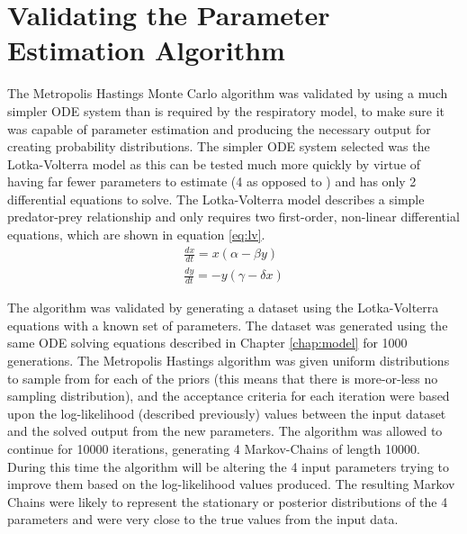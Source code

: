 \section{Validating the Parameter Estimation Algorithm}

The Metropolis Hastings Monte Carlo algorithm was validated by using a much simpler ODE system than is required by the respiratory model, to make sure it was capable of parameter estimation and producing the necessary output for creating probability distributions. The simpler ODE system selected was the Lotka-Volterra model as this can be tested much more quickly by virtue of having far fewer parameters to estimate (4 as opposed to ) and has only 2 differential equations to solve. The Lotka-Volterra model describes a simple predator-prey relationship\cite{Lotka1925,Volterra1931} and only requires two first-order, non-linear differential equations, which are shown in equation \ref{eq:lv}.
\begin{eqnarray}
\frac{dx}{dt} = x (\alpha - \beta y)\nonumber \\
\frac{dy}{dt} = -y (\gamma - \delta x)
\label{eq:lv}
\end{eqnarray}

The algorithm was validated by generating a dataset using the Lotka-Volterra equations with a known set of parameters. The dataset was generated using the same ODE solving equations described in Chapter \ref{chap:model} for 1000 generations. The Metropolis Hastings algorithm was given uniform distributions to sample from for each of the priors (this means that there is more-or-less no sampling distribution), and the acceptance criteria for each iteration were based upon the log-likelihood (described previously) values between the input dataset and the solved output from the new parameters. The algorithm was allowed to continue for 10000 iterations, generating 4 Markov-Chains of length 10000. During this time the algorithm will be altering the 4 input parameters trying to improve them based on the log-likelihood values produced. The resulting Markov Chains were likely to represent the stationary or posterior distributions of the 4 parameters and were very close to the true values from the input data.

